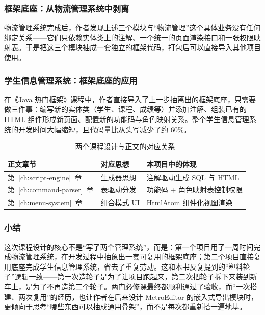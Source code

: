 \subsubsection{框架底座：从物流管理系统中剥离}

物流管理系统完成后，作者发现上述三个模块与“物流管理”这个具体业务没有任何绑定关系——它们只依赖实体类上的注解、一个统一的页面渲染接口和一张权限映射表。于是把这三个模块抽成一套独立的框架代码，打包后可以直接导入其他项目使用。

\subsubsection{学生信息管理系统：框架底座的应用}

在《Java 热门框架》课程中，作者直接导入了上一步抽离出的框架底座，只需要做三件事：编写新的实体类（学生、课程、成绩等）并添加注解、组装已有的 HTML 组件形成新页面、配置新的功能码与角色映射关系。整个学生信息管理系统的开发时间大幅缩短，且代码量比从头写减少了约 60\%。

\begin{table}[htbp]
	\centering
	\caption{两个课程设计与正文的对应关系}
	\label{tab:app-java-mapping}
	\begin{tabular}{lll}
		\toprule
		正文章节 & 对应思想 & 本项目中的体现 \\
		\midrule
		第~\ref{ch:script-engine}~章 & 生成器思想 & 注解驱动生成 SQL 与 HTML \\
		第~\ref{ch:command-parser}~章 & 表驱动分发 & 功能码 + 角色映射表控制权限 \\
		第~\ref{ch:menu-system}~章 & 组合模式 UI & HtmlAtom 组件化视图渲染 \\
		\bottomrule
	\end{tabular}
\end{table}

\subsubsection{小结}

这次课程设计的核心不是“写了两个管理系统”，而是：第一个项目用了一周时间完成物流管理系统，在开发过程中抽象出一套可复用的框架底座；第二个项目直接复用底座完成学生信息管理系统，省去了重复劳动。这和本书反复提到的“塑料轮子”逻辑一致——第一次造轮子是为了让项目跑起来，第二次把轮子拆下来装到新车上，是为了不再造第二个轮子。两门必修课最终都顺利通过了验收，而“一次搭建、两次复用”的经历，也让作者在后来设计 MetroEditor 的嵌入式导出模块时，更倾向于思考“哪些东西可以抽成通用骨架”，而不是每次都重新搭一遍地基。

